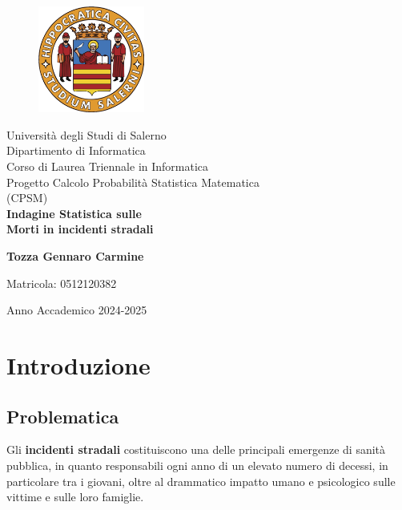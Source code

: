 \documentclass[14pt, openany, titlepage]{report} %
\begin{document}

\begin{titlepage}
\begin{center}
    \begin{figure}
        \includegraphics[width=3.5cm, height=3.5cm]{unisa.png}
        \centering
    \end{figure}
    {\Large Università degli Studi di Salerno}\\[0.2truecm]
    {\large Dipartimento di Informatica\\Corso di Laurea Triennale in Informatica}\\
    \hrulefill
    \vfill
    {\large Progetto Calcolo Probabilità Statistica Matematica\\(CPSM)}\\[0.1truecm]
    \vfill\vfill
    {\LARGE {\bf Indagine Statistica sulle\\[0.1truecm]Morti in incidenti stradali}}
    \vfill\vfill
    
    \hfill  \textbf{Tozza Gennaro Carmine}
    \centerline{\hfill Matricola: 0512120382}
    
    \vfill
    \hrulefill 
    \begin{center} Anno Accademico 2024-2025 \end{center}
\end{center}
\end{titlepage}

\tableofcontents

\chapter{Introduzione}
\section{Problematica}
Gli \textbf{incidenti stradali} costituiscono una delle principali emergenze 
di sanità pubblica, in quanto responsabili ogni anno di un elevato 
numero di decessi, in particolare tra i giovani, oltre al drammatico impatto umano e psicologico sulle vittime e 
 sulle loro famiglie. 
\noindent
\end{document}
